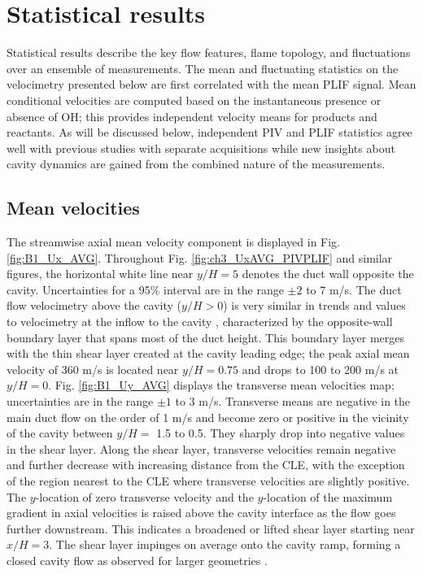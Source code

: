 \section*{Statistical results}
Statistical results describe the key flow features, flame topology, and fluctuations over an ensemble of measurements. The mean and fluctuating statistics on the velocimetry presented below are first correlated with the mean PLIF signal. Mean conditional velocities are computed based on the instantaneous presence or absence of OH; this provides independent velocity means for products and reactants. As will be discussed below, independent PIV and PLIF statistics agree well with previous studies with separate acquisitions \citep{TuttleCarterHsu2014, Kirik2017} while new insights about cavity dynamics are gained from the combined nature of the measurements.

\subsection*{Mean velocities}
The streamwise axial mean velocity component is displayed in Fig. \ref{fig:B1_Ux_AVG}. Throughout Fig. \ref{fig:ch3_UxAVG_PIVPLIF} and similar figures, the horizontal white line near $y/H=5$ denotes the duct wall opposite the cavity. Uncertainties for a 95\% interval are in the range $\pm2$ to 7 m/s. The duct flow velocimetry above the cavity ($y/H>0$) is very similar in trends and values to velocimetry at the inflow to the cavity \citep{LieberThesis}, characterized by the opposite-wall boundary layer that spans most of the duct height. This boundary layer merges with the thin shear layer created at the cavity leading edge; the peak axial mean velocity of 360 m/s is located near $y/H = 0.75$ and drops to 100 to 200 m/s at $y/H=0$. Fig. \ref{fig:B1_Uy_AVG} displays the transverse mean velocities map;  uncertainties are in the range $\pm1$ to 3 m/s. Transverse means are negative in the main duct flow on the order of 1 m/s and become zero or positive in the vicinity of the cavity between $y/H =$ 1.5 to 0.5. They sharply drop into negative values in the shear layer. Along the shear layer, transverse velocities remain negative and further decrease with increasing distance from the CLE, with the exception of the region nearest to the CLE where transverse velocities are slightly positive. The $y$-location of zero transverse velocity and the $y$-location of the maximum gradient in axial velocities is raised above the cavity interface as the flow goes further downstream. This indicates a broadened or lifted shear layer starting near $x/H=3$. The shear layer impinges on average onto the cavity ramp, forming a closed cavity flow as observed for larger geometries \citep{Kirik2017}. 

